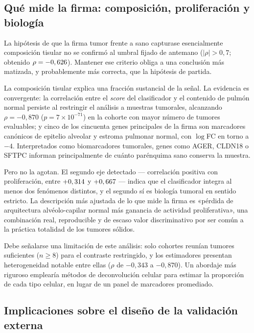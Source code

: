 \subsection{Qué mide la firma: composición, proliferación y biología}
\label{sec:disc-composicion}

La hipótesis de que la firma tumor frente a sano capturase esencialmente
composición tisular no se confirmó al umbral fijado de antemano
($|\rho|>0{,}7$; obtenido $\rho=-0,626$). Mantener ese criterio obliga a una
conclusión más matizada, y probablemente más correcta, que la hipótesis de
partida.

La composición tisular explica una fracción sustancial de la señal. La evidencia
es convergente: la correlación entre el \emph{score} del clasificador y el
contenido de pulmón normal persiste al restringir el análisis a muestras
tumorales, alcanzando $\rho=-0{,}870$ ($p=7\times10^{-71}$) en la cohorte con
mayor número de tumores evaluables; y cinco de los cincuenta genes principales de
la firma son marcadores canónicos de epitelio alveolar y estroma pulmonar normal,
con $\log$FC en torno a $-4$. Interpretados como biomarcadores tumorales, genes
como AGER, CLDN18 o SFTPC informan principalmente de cuánto parénquima sano
conserva la muestra.

Pero no la agotan. El segundo eje detectado --- correlación positiva con
proliferación, entre $+0,314$ y $+0,667$ --- indica que el clasificador
integra al menos dos fenómenos distintos, y el segundo sí es biología tumoral en
sentido estricto. La descripción más ajustada de lo que mide la firma es
«pérdida de arquitectura alvéolo-capilar normal más ganancia de actividad
proliferativa», una combinación real, reproducible y de escaso valor
discriminativo por ser común a la práctica totalidad de los tumores sólidos.

Debe señalarse una limitación de este análisis: solo \nrho{} cohortes reunían
tumores suficientes ($n\geq8$) para el contraste restringido, y los estimadores
presentan heterogeneidad notable entre ellas ($\rho$ de $-0{,}343$ a
$-0{,}870$). Un abordaje más riguroso emplearía métodos de deconvolución celular
para estimar la proporción de cada tipo celular, en lugar de un panel de
marcadores promediado.

\subsection{Implicaciones sobre el diseño de la validación externa}
\label{sec:disc-lodo}

